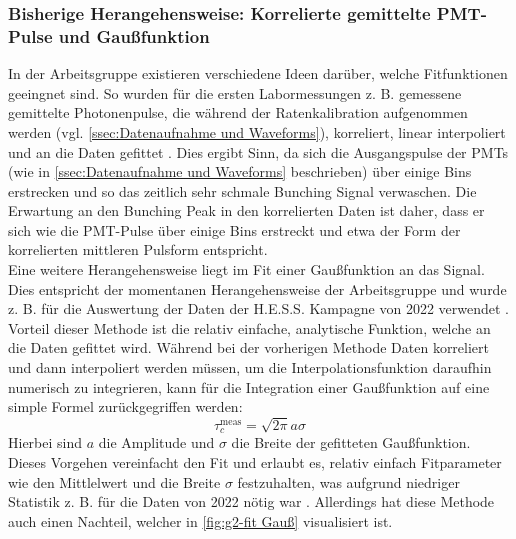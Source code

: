 \subsubsection{Bisherige Herangehensweise: Korrelierte gemittelte PMT-Pulse und Gaußfunktion}
\label{sssec:Fitfunktion - Bisherige Herangehensweise}
In der Arbeitsgruppe existieren verschiedene Ideen darüber, welche Fitfunktionen geeingnet sind. 
So wurden für die ersten Labormessungen z. B. gemessene gemittelte Photonenpulse, die während der Ratenkalibration aufgenommen werden (vgl. \autoref{ssec:Datenaufnahme und Waveforms}), korreliert, linear interpoliert und an die Daten gefittet \cite{zmijaOpticalIntensityInterferometry2021}. 
Dies ergibt Sinn, da sich die Ausgangspulse der PMTs (wie in \autoref{ssec:Datenaufnahme und Waveforms} beschrieben) über einige Bins erstrecken und so das zeitlich sehr schmale Bunching Signal verwaschen. 
Die Erwartung an den Bunching Peak in den korrelierten Daten ist daher, dass er sich wie die PMT-Pulse über einige Bins erstreckt und etwa der Form der korrelierten mittleren Pulsform entspricht. \\
Eine weitere Herangehensweise liegt im Fit einer Gaußfunktion an das Signal. 
Dies entspricht der momentanen Herangehensweise der Arbeitsgruppe und wurde z. B. für die Auswertung der Daten der H.E.S.S. Kampagne von 2022 verwendet \cite{zmijaFirstIntensityInterferometry2023}. 
Vorteil dieser Methode ist die relativ einfache, analytische Funktion, welche an die Daten gefittet wird. 
Während bei der vorherigen Methode Daten korreliert und dann interpoliert werden müssen, um die Interpolationsfunktion daraufhin numerisch zu integrieren, kann für die Integration einer Gaußfunktion auf eine simple Formel zurückgegriffen werden:
\begin{equation}
    \tau_c^{\mathrm{meas}} = \sqrt{2\pi} a\sigma
\end{equation}
Hierbei sind $a$ die Amplitude und $\sigma$ die Breite der gefitteten Gaußfunktion. 
Dieses Vorgehen vereinfacht den Fit und erlaubt es, relativ einfach Fitparameter wie den Mittlelwert und die Breite $\sigma$ festzuhalten, was aufgrund niedriger Statistik z. B. für die Daten von 2022 nötig war \cite{zmijaFirstIntensityInterferometry2023}. 
Allerdings hat diese Methode auch einen Nachteil, welcher in \autoref{fig:g2-fit Gauß} visualisiert ist. 
